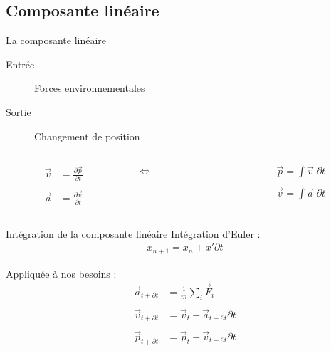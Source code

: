 \documentclass{beamer}
\newcommand{\deriv}{\partial \!}
\begin{document}
\subsection{Composante linéaire}

\begin{frame}{La composante linéaire}
  \begin{description}
  \item[Entrée] Forces environnementales
  \item[Sortie] Changement de position
  \end{description}

  \vfill

  \begin{columns}
    \begin{column}{3cm}
      \begin{align*}
        \vec{v} &= \frac{\deriv \vec{p}}{\deriv t} \\ \\
        \vec{a} &= \frac{\deriv \vec{v}}{\deriv t}
      \end{align*}
    \end{column}
    \begin{column}{2cm}
      \centering
      $\iff$
    \end{column}
    \begin{column}{3cm}
      \begin{align*}
        \vec{p} = \int \vec{v}\; \deriv t \\ \\
        \vec{v} = \int \vec{a}\; \deriv t
      \end{align*}
    \end{column}
  \end{columns}
\end{frame}

\begin{frame}{Intégration de la composante linéaire}
  Intégration d'Euler :
  \begin{align*}
    x_{n+1} = x_{n} + x' \deriv t
  \end{align*}

  \vfill

  Appliquée à nos besoins :
  \begin{align*}
    \vec{a}_{t + \deriv t} &= \frac{1}{m} \sum_i \vec{F}_i \\ \\
    \vec{v}_{t + \deriv t} &= \vec{v}_t + \vec{a}_{t + \deriv t} \deriv t \\ \\
    \vec{p}_{t + \deriv t} &= \vec{p}_t + \vec{v}_{t + \deriv t} \deriv t
  \end{align*}
\end{frame}
\end{document}
